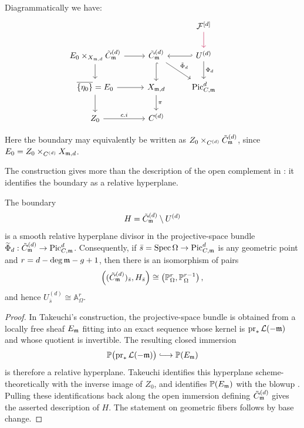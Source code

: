      

Diagrammatically we have:
\[
\begin{tikzcd}
    &  & \cF^{[d]} \arrow[d, purple]\\
    E_0 \times_{X_{\mdls,d}} \Cmod{d} \arrow[d] \arrow[r]  & \Cmod{d} \arrow[d, hook] \arrow[rd, "\tilde{\Phi}_d"]  & U^{(d)} \arrow[l, hook'] \arrow[d, "\Phi_d"] \\
\overline{\{\eta_0 \}} =  E_0 \arrow[r] \arrow[d] & 
X_{\mdls, d} \arrow[d, "\pi"]  &  \PicCm[d] &  \\
Z_0 \arrow[r, "c.i"]           & C^{(d)}          
\end{tikzcd}
\] 

Here the boundary may equivalently be written as
$Z_0 \times_{C^{(d)}} \Cmod{d}$, since
$E_0=Z_0\times_{C^{(d)}}X_{\mdls,d}$.

The construction gives more than the description of the open complement in
: it identifies the boundary
as a relative hyperplane.

\begin{cor}
\label{lemma:geometric-generic-fiber-takeuchi}
The boundary
\[
    H=\Cmod{d}\setminus U^{(d)}
\]
is a smooth relative hyperplane divisor in the projective-space bundle
$\widetilde\Phi_d:\Cmod{d}\to\PicCm[d]$. Consequently, if
$\bar s=\Spec\Omega\to\PicCm[d]$ is any geometric point and
$r=d-\deg\mdls-g+1$, then there is an isomorphism of pairs
\[
    \left((\Cmod{d})_{\bar s},H_{\bar s}\right)
    \cong
    \left(\mathbb P^r_{\Omega},\mathbb P^{r-1}_{\Omega}\right),
\]
and hence $U^{(d)}_{\bar s}\cong\mathbb A^r_{\Omega}$.
\end{cor}

\begin{proof}
In Takeuchi's construction, the projective-space bundle is obtained from a
locally free sheaf $E_{\mdls}$ fitting into an exact sequence whose kernel
is $\operatorname{pr}_*\cL(-\mdls)$ and whose quotient is invertible.
The resulting closed immersion
\[
    \mathbb P\bigl(\operatorname{pr}_*\cL(-\mdls)\bigr)
    \lhook\joinrel\longrightarrow \mathbb P(E_{\mdls})
\]
is therefore a relative hyperplane. Takeuchi identifies this hyperplane
scheme-theoretically with the inverse image of $Z_0$, and identifies
$\mathbb P(E_{\mdls})$ with the blowup
\cite[Lemmas~3.2 and~3.3(1), Theorem~3.4]{takeuchi2019blow}. Pulling these
identifications back along the open immersion defining $\Cmod{d}$ gives
the asserted description of $H$. The statement on geometric fibers follows
by base change.
\end{proof}

